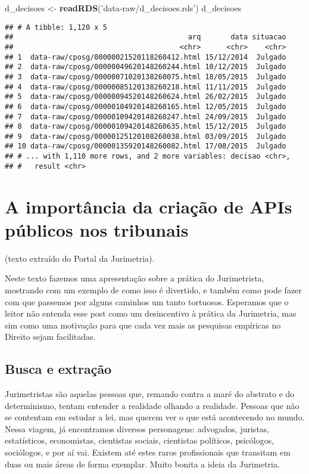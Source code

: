 \documentclass[]{book}
\newenvironment{Shaded}{\begin{snugshade}}{\end{snugshade}}
\newcommand{\KeywordTok}[1]{\textcolor[rgb]{0.13,0.29,0.53}{\textbf{{#1}}}}
\newcommand{\StringTok}[1]{\textcolor[rgb]{0.31,0.60,0.02}{{#1}}}
\newcommand{\NormalTok}[1]{{#1}}
\begin{document}
\begin{Shaded}
\begin{Highlighting}[]
\NormalTok{d_decisoes <-}\StringTok{ }\KeywordTok{readRDS}\NormalTok{(}\StringTok{'data-raw/d_decisoes.rds'}\NormalTok{)}
\NormalTok{d_decisoes}
\end{Highlighting}
\end{Shaded}

\begin{verbatim}
## # A tibble: 1,120 x 5
##                                         arq       data situacao
##                                       <chr>      <chr>    <chr>
## 1  data-raw/cposg/00000021520118260412.html 15/12/2014  Julgado
## 2  data-raw/cposg/00000049620148260244.html 10/12/2015  Julgado
## 3  data-raw/cposg/00000071020138260075.html 18/05/2015  Julgado
## 4  data-raw/cposg/00000085120138260218.html 11/11/2015  Julgado
## 5  data-raw/cposg/00000094520148260624.html 26/02/2015  Julgado
## 6  data-raw/cposg/00000104920148260165.html 12/05/2015  Julgado
## 7  data-raw/cposg/00000109420148260247.html 24/09/2015  Julgado
## 8  data-raw/cposg/00000109420148260635.html 15/12/2015  Julgado
## 9  data-raw/cposg/00000125120108260038.html 03/09/2015  Julgado
## 10 data-raw/cposg/00000135920148260082.html 17/08/2015  Julgado
## # ... with 1,110 more rows, and 2 more variables: decisao <chr>,
## #   result <chr>
\end{verbatim}

\section{A importância da criação de APIs públicos nos
tribunais}\label{a-importancia-da-criacao-de-apis-publicos-nos-tribunais}

(texto extraído do Portal da Jurimetria).

Neste texto fazemos uma apresentação sobre a prática do Jurimetrista,
mostrando com um exemplo de como isso é divertido, e também como pode
fazer com que passemos por alguns caminhos um tanto tortuosos. Esperamos
que o leitor não entenda esse post como um desincentivo à prática da
Jurimetria, mas sim como uma motivação para que cada vez mais as
pesquisas empíricas no Direito sejam facilitadas.

\subsection{Busca e extração}\label{busca-e-extracao}

Jurimetristas são aquelas pessoas que, remando contra a maré do abstrato
e do determinismo, tentam entender a realidade olhando a realidade.
Pessoas que não se contentam em estudar a lei, mas querem ver o que está
acontecendo no mundo. Nessa viagem, já encontramos diversos personagens:
advogados, juristas, estatísticos, economistas, cientistas sociais,
cientistas políticos, psicólogos, sociólogos, e por aí vai. Existem até
estes raros profissionais que transitam em duas ou mais áreas de forma
exemplar. Muito bonita a ideia da Jurimetria.
\end{document}
